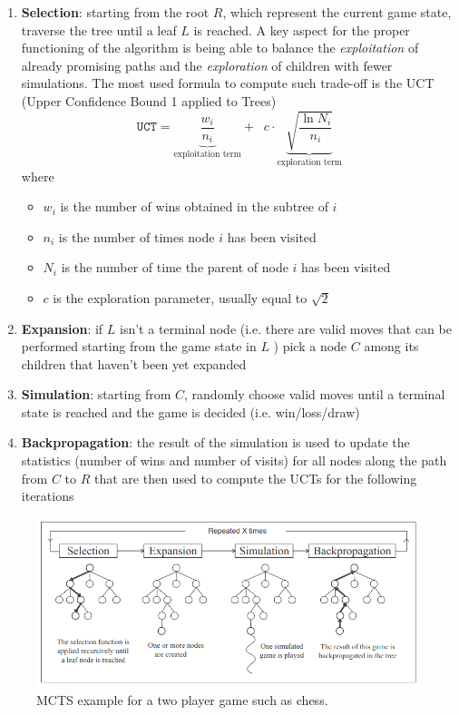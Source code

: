 \begin{enumerate}
    \item \textbf{Selection}: starting from the root $R$, which represent the current game state, traverse the tree until a leaf $L$ is reached. A key aspect for the proper functioning of the algorithm is being able to balance the \textit{exploitation} of already promising paths and the \textit{exploration} of children with fewer simulations. The most used formula to compute such trade-off is the UCT (Upper Confidence Bound 1 applied to Trees)
          \begin{equation}
              \texttt{UCT} = \underbrace{\frac {w_{i}}{n_{i}}}_{\text{exploitation term}}+\;\; c \cdot \underbrace{{\sqrt {\frac {\ln N_{i}}{n_{i}}}}}_{\text{exploration term}}
          \end{equation}
          where
          \begin{itemize}
              \item $w_i$ is the number of wins obtained in the subtree of $i$
              \item $n_i$ is the number of times node $i$ has been visited
              \item $N_i$ is the number of time the parent of node $i$ has been visited
              \item $c$ is the exploration parameter, usually equal to $\sqrt{2}$
          \end{itemize}

    \item \textbf{Expansion}: if $L$ isn't a terminal node (i.e. there are valid moves that can be performed starting from the game state in $L$ ) pick a node $C$ among its children that haven't been yet expanded

    \item \textbf{Simulation}: starting from $C$, randomly choose valid moves until a terminal state is reached and the game is decided (i.e. win/loss/draw)

    \item \textbf{Backpropagation}: the result of the simulation is used to update the statistics (number of wins and number of visits) for all nodes along the path from $C$ to $R$ that are then used to compute the UCTs for the following iterations
\end{enumerate}

\begin{figure}
    \centering
    \includegraphics[width=\linewidth]{figures/mcts.png}
    \caption{MCTS example for a two player game such as chess.}
    \label{fig:mcts}
\end{figure}
